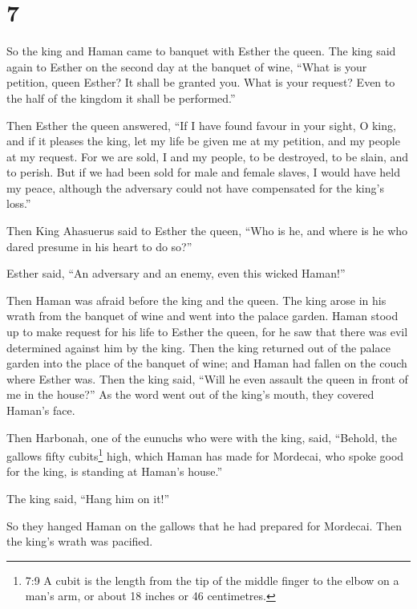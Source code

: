 \hypertarget{section-6}{%
\section{7}\label{section-6}}

 So the king and Haman came to banquet with Esther the
queen.  The king said again to Esther on the second day at
the banquet of wine, ``What is your petition, queen Esther? It shall be
granted you. What is your request? Even to the half of the kingdom it
shall be performed.''

 Then Esther the queen answered, ``If I have found favour in
your sight, O king, and if it pleases the king, let my life be given me
at my petition, and my people at my request.  For we are
sold, I and my people, to be destroyed, to be slain, and to perish. But
if we had been sold for male and female slaves, I would have held my
peace, although the adversary could not have compensated for the king's
loss.''

 Then King Ahasuerus said to Esther the queen, ``Who is he,
and where is he who dared presume in his heart to do so?''

 Esther said, ``An adversary and an enemy, even this wicked
Haman!''

Then Haman was afraid before the king and the queen.  The
king arose in his wrath from the banquet of wine and went into the
palace garden. Haman stood up to make request for his life to Esther the
queen, for he saw that there was evil determined against him by the
king.  Then the king returned out of the palace garden into
the place of the banquet of wine; and Haman had fallen on the couch
where Esther was. Then the king said, ``Will he even assault the queen
in front of me in the house?'' As the word went out of the king's mouth,
they covered Haman's face.

 Then Harbonah, one of the eunuchs who were with the king,
said, ``Behold, the gallows fifty cubits\footnote{7:9 A cubit is the
  length from the tip of the middle finger to the elbow on a man's arm,
  or about 18 inches or 46 centimetres.} high, which Haman has made for
Mordecai, who spoke good for the king, is standing at Haman's house.''

The king said, ``Hang him on it!''

 So they hanged Haman on the gallows that he had prepared
for Mordecai. Then the king's wrath was pacified.

